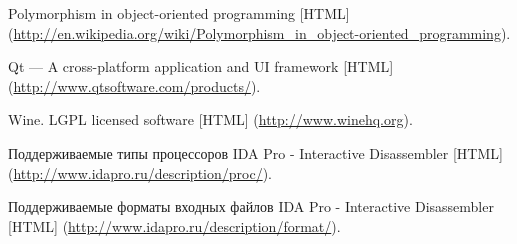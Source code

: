 \begin{thebibliography}{99}
Polymorphism in object-oriented programming [HTML] (\url{http://en.wikipedia.org/wiki/Polymorphism_in_object-oriented_programming}).

Qt --- A cross-platform application and UI framework [HTML] (\url{http://www.qtsoftware.com/products/}).

Wine. LGPL licensed software [HTML] (\url{http://www.winehq.org}).

Поддерживаемые типы процессоров IDA Pro - Interactive Disassembler [HTML] (\url{http://www.idapro.ru/description/proc/}).

Поддерживаемые форматы входных файлов IDA Pro - Interactive Disassembler [HTML] (\url{http://www.idapro.ru/description/format/}).

\end{thebibliography}






















